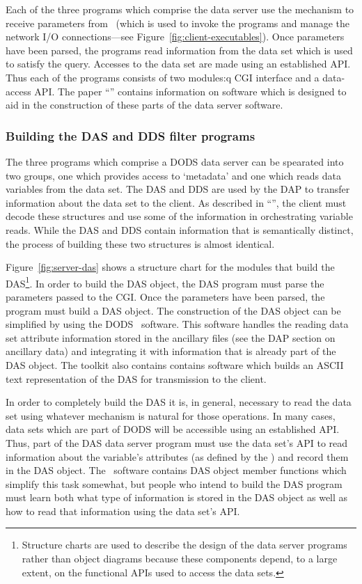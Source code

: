 Each of the three programs which comprise the data server use the \CGI
mechanism to receive parameters from \HTTPD\ (which is used to invoke the
programs and manage the network I/O connections---see
Figure~\ref{fig:client-executables}). Once parameters have been parsed, the
programs read information from the data set which is used to satisfy the
query. Accesses to the data set are made using an established API\@. Thus each
of the programs consists of two modules:q CGI interface and a data-access
API\@. The paper ``\TOOLKIT'' contains information on software which is
designed to aid in the construction of these parts of the data server
software.

\subsubsection{Building the DAS and DDS filter programs}

The three programs which comprise a DODS data server can be spearated into
two groups, one which provides access to `metadata' and one which reads
data variables from the data set. The DAS and DDS are used by the DAP to
transfer information about the data set to the client. As described in
``\DDA'', the client must decode these structures and use some of the
information in orchestrating variable reads. While the DAS and DDS contain
information that is semantically distinct, the process of building these two
structures is almost identical.

Figure~\ref{fig:server-das} shows a structure chart for the modules that
build the DAS\footnote{Structure charts are used to describe the design of
  the data server programs rather than object diagrams because these
  components depend, to a large extent, on the functional APIs used to access
  the data sets.}. In order to build the DAS object, the DAS program must
parse the parameters passed to the CGI\@. Once the parameters have been parsed,
the program must build a DAS object. The construction of the DAS object can
be simplified by using the DODS \Toolkit\ software. This software handles
the reading data set attribute information stored in the ancillary files (see
the DAP section on ancillary data) and integrating it with information that
is already part of the DAS object. The toolkit also contains
contains software which builds an ASCII text representation of the DAS for
transmission to the client.

In order to completely build the DAS it is, in general, necessary to read the
data set using whatever mechanism is natural for those operations. In many
cases, data sets which are part of DODS will be accessible using an
established API\@. Thus, part of the DAS data server program must use the data
set's API to read information about the variable's attributes (as defined by
the \dap) and record them in the DAS object. The \toolkit\ software contains
DAS object member functions which simplify this task somewhat, but people who
intend to build the DAS program must learn both what type of information is
stored in the DAS object as well as how to read that information using the
data set's API\@.

